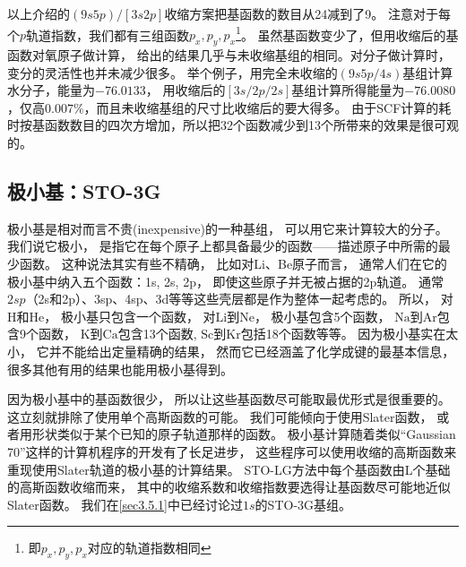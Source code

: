 以上介绍的$(9s5p)/[3s2p]$收缩方案把基函数的数目从24减到了9。
注意对于每个$p$轨道指数，我们都有三组函数$p_x,p_y,p_x$\footnote{
	即$p_x,p_y,p_x$对应的轨道指数相同
}。
虽然基函数变少了，但用收缩后的基函数对氧原子做计算，
给出的结果几乎与未收缩基组的相同。对分子做计算时，变分的灵活性也并未减少很多。
举个例子，用完全未收缩的$(9s5p/4s)$基组计算水分子，能量为$-76.0133$，
用收缩后的$[3s/2p/2s]$基组计算所得能量为$-76.0080$，仅高$0.007\%$，而且未收缩基组的尺寸比收缩后的要大得多。
由于SCF计算的耗时按基函数数目的四次方增加，所以把32个函数减少到13个所带来的效果是很可观的。

\subsection{极小基：STO-3G}
极小基是相对而言不贵(inexpensive)的一种基组，
可以用它来计算较大的分子。
我们说它极小，
是指它在每个原子上都具备最少的函数——描述原子中所需的最少函数。
这种说法其实有些不精确，
比如对Li、Be原子而言，
通常人们在它的极小基中纳入五个函数：1s, 2s, 2p，
即使这些原子并无被占据的2p轨道。
通常$2sp$（2s和2p）、3sp、4sp、3d等等这些壳层都是作为整体一起考虑的。
所以，
对$\mathrm{H}$和$\mathrm{He}$，
极小基只包含一个函数，
对$\mathrm{Li}$到$\mathrm{Ne}$，
极小基包含5个函数，
$\mathrm{Na}$到$\mathrm{Ar}$包含9个函数，
$\mathrm{K}$到$\mathrm{Ca}$包含13个函数,
$\mathrm{Sc}$到$\mathrm{Kr}$包括18个函数等等。
因为极小基实在太小，
它并不能给出定量精确的结果，
然而它已经涵盖了化学成键的最基本信息，
很多其他有用的结果也能用极小基得到。


因为极小基中的基函数很少，
所以让这些基函数尽可能取最优形式是很重要的。
这立刻就排除了使用单个高斯函数的可能。
我们可能倾向于使用Slater函数，
或者用形状类似于某个已知的原子轨道那样的函数。
极小基计算随着类似“Gaussian 70”这样的计算机程序的开发有了长足进步，
这些程序可以使用收缩的高斯函数来重现使用Slater轨道的极小基的计算结果。
STO-LG方法中每个基函数由L个基础的高斯函数收缩而来，
其中的收缩系数和收缩指数要选得让基函数尽可能地近似Slater函数。
我们在\autoref{sec3.5.1}中已经讨论过$1s$的STO-3G基组。


